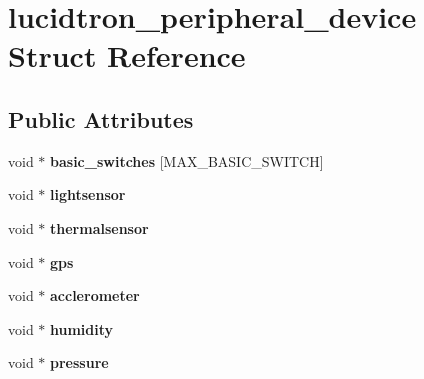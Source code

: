 \hypertarget{structlucidtron__peripheral__device}{}\section{lucidtron\+\_\+peripheral\+\_\+device Struct Reference}
\label{structlucidtron__peripheral__device}
\subsection*{Public Attributes}
\begin{DoxyCompactItemize}
\item 
void $\ast$ {\bfseries basic\+\_\+switches} \mbox{[}M\+A\+X\+\_\+\+B\+A\+S\+I\+C\+\_\+\+S\+W\+I\+T\+CH\mbox{]}\hypertarget{structlucidtron__peripheral__device_a398f12cc9feda167809af01c2c761fe6}{}\label{structlucidtron__peripheral__device_a398f12cc9feda167809af01c2c761fe6}

\item 
void $\ast$ {\bfseries lightsensor}\hypertarget{structlucidtron__peripheral__device_a02dbfad85310a5340e727016a8fba839}{}\label{structlucidtron__peripheral__device_a02dbfad85310a5340e727016a8fba839}

\item 
void $\ast$ {\bfseries thermalsensor}\hypertarget{structlucidtron__peripheral__device_a1bbb2a943ee3a8b54fa7ed2c59d14dbc}{}\label{structlucidtron__peripheral__device_a1bbb2a943ee3a8b54fa7ed2c59d14dbc}

\item 
void $\ast$ {\bfseries gps}\hypertarget{structlucidtron__peripheral__device_ae2425bbe019ad85e5ee273a66b52e75c}{}\label{structlucidtron__peripheral__device_ae2425bbe019ad85e5ee273a66b52e75c}

\item 
void $\ast$ {\bfseries acclerometer}\hypertarget{structlucidtron__peripheral__device_aadd5545a8b7d309331053040265fb393}{}\label{structlucidtron__peripheral__device_aadd5545a8b7d309331053040265fb393}

\item 
void $\ast$ {\bfseries humidity}\hypertarget{structlucidtron__peripheral__device_a281fe763dde50d921a9c05a59630e39b}{}\label{structlucidtron__peripheral__device_a281fe763dde50d921a9c05a59630e39b}

\item 
void $\ast$ {\bfseries pressure}\hypertarget{structlucidtron__peripheral__device_acb952b6606d246a046e2ca6da8dcbd1f}{}\label{structlucidtron__peripheral__device_acb952b6606d246a046e2ca6da8dcbd1f}


\end{DoxyCompactItemize}
